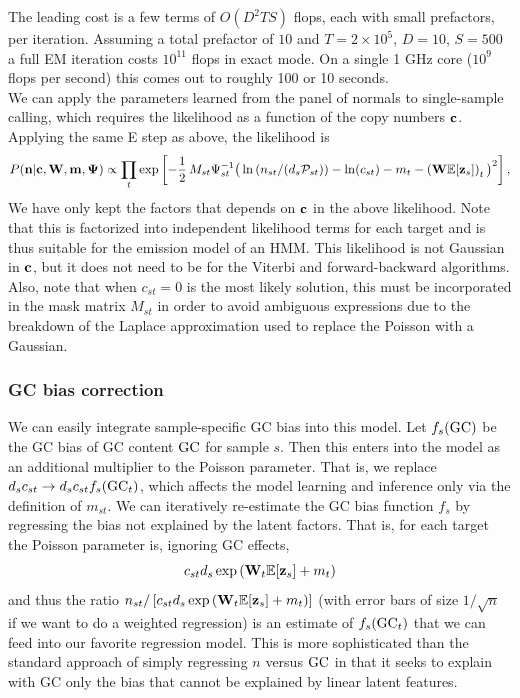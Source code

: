 \documentclass[nofootinbib,amssymb,amsmath]{revtex4}
\newcommand{\vc}{{\bf c}}
\newcommand{\vz}{{\bf z}}
\newcommand{\vn}{{\bf n}}
\newcommand{\vm}{{\bf m}}
\newcommand{\vW}{{\bf W}}
\newcommand{\vPsi}{{\bf \Psi}}
\newcommand{\PP}{\mathcal{P}}
\newcommand{\EE}{\mathbb{E}}
\begin{document}
The leading cost is a few terms of $O(D^2 T S)$ flops, each with small prefactors, per iteration. Assuming a total prefactor of $10$ and $T = 2 \times 10^5$, $D = 10$, $S = 500$ a full EM iteration costs $10^{11}$ flops in exact mode. On a single 1 GHz core ($10^9$ flops per second) this comes out to roughly 100 or 10 seconds.\\

We can apply the parameters learned from the panel of normals to single-sample calling, which requires the likelihood as a function of the copy numbers $\vc$.  Applying the same E step as above, the likelihood is
\begin{equation}
P(\vn | \vc, \vW, \vm, \vPsi) \propto \prod_t \exp \left[ -\frac{1}{2} \, M_{st} \Psi_{st}^{-1} \big( \ln \left( n_{st} / (d_s \PP_{st}) \right) - \ln(c_{st}) - m_t - \left(\vW \EE[\vz_{s}]\right)_t \big)^2 \right],
\end{equation}
We have only kept the factors that depends on $\vc$ in the above likelihood. Note that this is factorized into independent likelihood terms for each target and is thus suitable for the emission model of an HMM.  This likelihood is not Gaussian in $\vc$, but it does not need to be for the Viterbi and forward-backward algorithms. Also, note that when $c_{st} = 0$ is the most likely solution, this must be incorporated in the mask matrix $M_{st}$ in order to avoid ambiguous expressions due to the breakdown of the Laplace approximation used to replace the Poisson with a Gaussian.\\

\subsubsection{GC bias correction}
We can easily integrate sample-specific GC bias into this model.  Let $f_s({\rm GC})$ be the GC bias of GC content ${\rm GC}$ for sample $s$.  Then this enters into the model as an additional multiplier to the Poisson parameter.  That is, we replace $d_s c_{st} \rightarrow d_s c_{st} f_s({\rm GC}_t)$, which affects the model learning and inference only via the definition of $m_{st}$.  We can iteratively re-estimate the GC bias function $f_s$ by regressing the bias not explained by the latent factors.  That is, for each target the Poisson parameter is, ignoring GC effects,
\begin{equation}
c_{st} d_s \exp \left( \vW_t \EE[\vz_s] + m_t \right)
\end{equation}
and thus the ratio $n_{st} / \left[ c_{st} d_s \exp \left( \vW_t \EE[\vz_s] + m_t \right) \right]$ (with error bars of size $1/\sqrt{n}$ if we want to do a weighted regression) is an estimate of $f_s({\rm GC}_t)$ that we can feed into our favorite regression model.  This is more sophisticated than the standard approach of simply regressing $n$ versus ${\rm GC}$ in that it seeks to explain with GC only the bias that cannot be explained by linear latent features.
\end{document}
